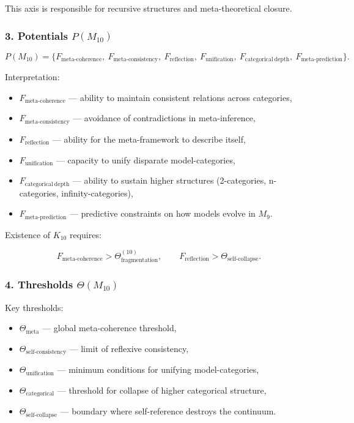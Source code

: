 This axis is responsible for recursive structures and 
meta-theoretical closure.

\subsubsection*{3. Potentials $P(M_{10})$}

\[
P(M_{10}) =
\{
F_{\mathrm{meta\mbox{-}coherence}},\
F_{\mathrm{meta\mbox{-}consistency}},\
F_{\mathrm{reflection}},\
F_{\mathrm{unification}},\
F_{\mathrm{categorical\ depth}},\
F_{\mathrm{meta\mbox{-}prediction}}
\}.
\]

Interpretation:

\begin{itemize}
    \item $F_{\mathrm{meta\mbox{-}coherence}}$ — ability to maintain 
        consistent relations across categories,
    \item $F_{\mathrm{meta\mbox{-}consistency}}$ — avoidance of 
        contradictions in meta-inference,
    \item $F_{\mathrm{reflection}}$ — ability for the meta-framework to describe itself,
    \item $F_{\mathrm{unification}}$ — capacity to unify disparate model-categories,
    \item $F_{\mathrm{categorical\ depth}}$ — ability to sustain higher structures 
        (2-categories, n-categories, infinity-categories),
    \item $F_{\mathrm{meta\mbox{-}prediction}}$ — predictive constraints on 
        how models evolve in $M_9$.
\end{itemize}

Existence of $K_{10}$ requires:

\[
F_{\mathrm{meta\mbox{-}coherence}}>\Theta_{\mathrm{fragmentation}}^{(10)},
\qquad
F_{\mathrm{reflection}}>\Theta_{\mathrm{self\mbox{-}collapse}}.
\]

\subsubsection*{4. Thresholds $\Theta(M_{10})$}

Key thresholds:

\begin{itemize}
    \item $\Theta_{\mathrm{meta}}$ — global meta-coherence threshold,
    \item $\Theta_{\mathrm{self\mbox{-}consistency}}$ — limit of reflexive consistency,
    \item $\Theta_{\mathrm{unification}}$ — minimum conditions for unifying model-categories,
    \item $\Theta_{\mathrm{categorical}}$ — threshold for collapse of higher categorical structure,
    \item $\Theta_{\mathrm{self\mbox{-}collapse}}$ — boundary where self-reference 
        destroys the continuum.
\end{itemize}

